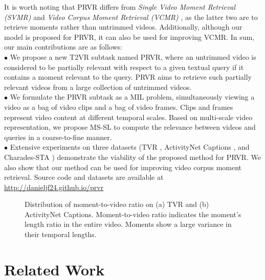 \documentclass[sigconf]{acmart}
\begin{document}
It is worth noting that PRVR differs from \emph{Single Video Moment Retrieval (SVMR)} \cite{yuan2019find,zhang2020learning,xiao2021boundary,yang2021deconfounded} and \emph{Video Corpus Moment Retrieval (VCMR)} \cite{lei2020tvr,zhang2020hierarchical,zhang2021video,hou2021conquer}, as the latter two are to retrieve moments rather than untrimmed videos.
Additionally, although our model is proposed for PRVR, it can also be used for improving VCMR.
In sum, our main contributions are as follows: \\
    $\bullet$ We propose a new T2VR subtask named PRVR, where an untrimmed video is considered to be partially relevant with respect to a given textual query if it contains a moment relevant to the query. PRVR aims to retrieve such partially relevant videos from a large collection of untrimmed videos. \\
   $\bullet$  We formulate the PRVR subtask as a MIL problem, simultaneously viewing a video as a bag of video clips and a bag of video frames. Clips and frames represent video content at different temporal scales. Based on multi-scale video representation, we propose MS-SL to compute the  relevance between videos and queries in a coarse-to-fine manner. \\
   $\bullet$  Extensive experiments on three datasets (TVR \cite{lei2020tvr}, ActivityNet Captions \cite{krishna2017dense}, and Charades-STA \cite{gao2017tall}) demonstrate the viability of the proposed method for PRVR. We also show that our method can be used for improving video corpus moment retrieval. Source code and datasets are available at \url{http://danieljf24.github.io/prvr}



\begin{figure}[tb!]
\vspace{-4mm}
\caption{Distribution of moment-to-video ratio on (a) TVR and (b) ActivityNet Captions. Moment-to-video ratio indicates the moment's length ratio in the entire video. Moments show a large variance in their temporal lengths. }\label{fig:ratio_distribution}
\end{figure}


\section{Related Work} \label{sec:rel-work}
\end{document}

